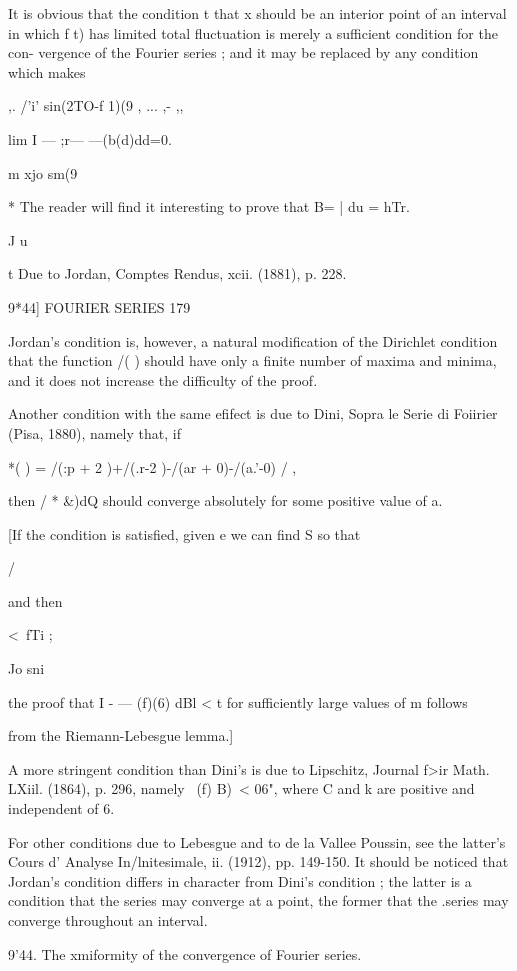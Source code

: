 It is obvious that the condition t that x should be an interior point
of an interval in which f t) has limited total fluctuation is merely a
sufficient condition for the con- vergence of the Fourier series ; and
it may be replaced by any condition which makes

,. /'i' sin(2TO-f 1)(9 , ... ,- ,,

lim I — ;r— —(b(d)dd=0.

m xjo sm(9

* The reader will find it interesting to prove that B= | du = hTr.

J u

t Due to Jordan, Comptes Rendus, xcii. (1881), p. 228.

9*44] FOURIER SERIES 179

Jordan's condition is, however, a natural modification of the
Dirichlet condition that the function /( ) should have only a finite
number of maxima and minima, and it does not increase the difficulty
of the proof.

Another condition with the same efifect is due to Dini, Sopra le Serie
di Foiirier (Pisa, 1880), namely that, if

*( ) = /(:p + 2 )+/(.r-2 )-/(ar + 0)-/(a.'-0) / ,

then / * \&)dQ should converge absolutely for some positive value of
a.

[If the condition is satisfied, given e we can find S so that

/

and then

<\ fTi ;

Jo sni

the proof that I - — (f)(6) dBl < t for sufficiently large values of m
follows

from the Riemann-Lebesgue lemma.]

A more stringent condition than Dini's is due to Lipschitz, Journal
f>ir Math. LXiil. (1864), p. 296, namely \ (f) B)\ < 06", where C and
k are positive and independent of 6.

For other conditions due to Lebesgue and to de la Vallee Poussin, see
the latter's Cours d' Analyse In/lnitesimale, ii. (1912), pp. 149-150.
It should be noticed that Jordan's condition differs in character from
Dini's condition ; the latter is a condition that the series may
converge at a point, the former that the .series may converge
throughout an interval.

9'44. The xmiformity of the convergence of Fourier series.


